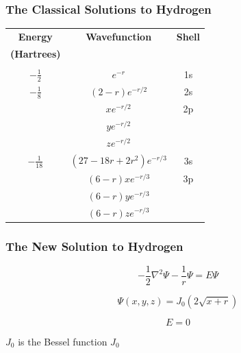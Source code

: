 \documentclass{beamer}
\begin{document}

\begin{frame}
\frametitle{The Classical Solutions to Hydrogen}
\begin{center}
\begin{tabular}{ccc}
{\bf Energy}		& {\bf Wavefunction}		& {\bf Shell} \\
{\bf (Hartrees)}	& & \\
\\
$-\frac{1}{2}$		& $e^{-r}$			& 1s \\
$-\frac{1}{8}$		& $(2-r)e^{-r/2}$		& 2s \\
			& $xe^{-r/2}$			& 2p \\
			& $ye^{-r/2}$			\\
			& $ze^{-r/2}$			\\
$-\frac{1}{18}$		& $(27-18r+2r^2)e^{-r/3}$	& 3s \\
			& $(6-r)xe^{-r/3}$		& 3p \\
			& $(6-r)ye^{-r/3}$		\\
			& $(6-r)ze^{-r/3}$		\\
\end{tabular}
\end{center}
\end{frame}

\begin{frame}
\frametitle{The New Solution to Hydrogen}

\[ - \frac{1}{2} \nabla^2 \Psi - \frac{1}{r} \Psi = E \Psi \]

\[ \Psi(x,y,z) = J_0(2\sqrt{x+r}) \]


\[ E = 0 \]

\vskip 0.5in

$J_0$ is the Bessel function $J_0$

\end{frame}
\end{document}
